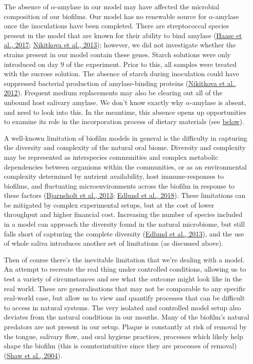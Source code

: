 \documentclass[
  letterpaper,
]{book}
\begin{document}
The absence of \(\alpha\)-amylase in our model may have affected the
microbial composition of our biofilms. Our model has no renewable source
for \(\alpha\)-amylase once the inoculations have been completed. There
are streptococcal species present in the model that are known for their
ability to bind amylase
(\protect\hyperlink{ref-haaseComparativeGenomics2017}{Haase et al.,
2017}; \protect\hyperlink{ref-nikitkovaStarchBiofilms2013}{Nikitkova et
al., 2013}); however, we did not investigate whether the strains present
in our model contain these genes. Starch solutions were only introduced
on day 9 of the experiment. Prior to this, all samples were treated with
the sucrose solution. The absence of starch during inoculation could
have suppressed bacterial production of amylase-binding proteins
(\protect\hyperlink{ref-nikitkovaEffectStarch2012}{Nikitkova et al.,
2012}). Frequent medium replacements may also be clearing out all of the
unbound host salivary amylase. We don't know exactly why
\(\alpha\)-amylase is absent, and need to look into this. In the
meantime, this absence opens up opportunities to examine its role in the
incorporation process of dietary materials (see
\protect\hyperlink{bfmodels-in-arch}{below}).

A well-known limitation of biofilm models in general is the difficulty
in capturing the diversity and complexity of the natural oral biome.
Diversity and complexity may be represented as interspecies communities
and complex metabolic dependencies between organisms within the
communities, or as an environmental complexity determined by nutrient
availability, host immune-responses to biofilms, and fluctuating
microenvironments across the biofilm in response to these factors
(\protect\hyperlink{ref-bjarnsholtVivoBiofilm2013}{Bjarnsholt et al.,
2013}; \protect\hyperlink{ref-edlundUncoveringComplex2018}{Edlund et
al., 2018}). These limitations can be mitigated by complex experimental
setups, but at the cost of lower throughput and higher financial cost.
Increasing the number of species included in a model can approach the
diversity found in the natural microbiome, but still falls short of
capturing the complete diversity
(\protect\hyperlink{ref-edlundBiofilmModel2013}{Edlund et al., 2013}),
and the use of whole saliva introduces another set of limitations (as
discussed above).

Then of course there's the inevitable limitation that we're dealing with
a model. An attempt to recreate the real thing under controlled
conditions, allowing us to test a variety of circumstances and see what
the outcome might look like in the real world. These are generalisations
that may not be comparable to any specific real-world case, but allow us
to view and quantify processes that can be difficult to access in
natural systems. The very isolated and controlled model setup also
deviates from the natural conditions in our mouths. Many of the
biofilm's natural predators are not present in our setup. Plaque is
constantly at risk of removal by the tongue, salivary flow, and oral
hygiene practices, processes which likely help shape the biofilm (this
is counterintuitive since they are processes of removal)
(\protect\hyperlink{ref-shawCommonalityElastic2004}{Shaw et al., 2004}).
\end{document}
